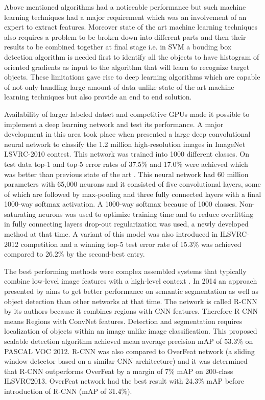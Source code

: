 \documentclass[11pt]{article}
\begin{document}
Above mentioned algorithms had a noticeable performance but such machine learning techniques had a major requirement which was an involvement of an expert to extract features. Moreover state of the art machine learning techniques also requires a problem to be broken down into different parts and then their results to be combined together at final stage i.e. in SVM a bouding box detection algorithm is needed first to identify all the objects to have histogram of oriented gradients as input to the algorithm that will learn to recognize target objects. These limitations gave rise to deep learning algorithms which are capable of not only handling large amount of data unlike state of the art machine learning techniques but also provide an end to end solution.

Availability of larger labeled datset and competitive GPUs made it possible to implement a deep learning network and test its performance. A major development in this area took place when \cite{krizhevsky2012imagenet} presented a large deep convolutional neural network to classify the 1.2 million high-resolution images in ImageNet LSVRC-2010 contest. This network was trained into 1000 different classes. On test data top-1 and top-5 error rates of 37.5\% and 17.0\% were achieved which was better than previous state of the art \cite{krizhevsky2012imagenet}. This neural network had 60 million parameters with 65,000 neurons and it consisted of five convolutional layers, some of which are followed by max-pooling and three fully connected layers with a final 1000-way softmax activation. A 1000-way softmax because of 1000 classes. Non-saturating neurons was used to optimize training time and to reduce overfitting in fully connecting layers drop-out regularization was used, a newly developed method at that time. A variant of this model was also introduced in ILSVRC-2012 competition and a winning top-5 test error rate of 15.3\% was achieved
compared to 26.2\% by the second-best entry.

The best performing methods were complex assembled systems that typically combine low-level image features with a high-level context \cite{girshick_rich_2013}. In 2014 an approach presented by \cite{girshick_rich_2013} aims to get better performance on semantic segmentation as well as object detection than other networks at that time. The network is called R-CNN by its authors because it combines regions with CNN features. Therefore R-CNN means Regions with ConvNet features. Detection and segmentation requires localization of objects within an image unlike image classification. This proposed scalable detection algorithm achieved mean average precision mAP of 53.3\% on PASCAL VOC 2012. R-CNN was also compared to OverFeat network (a sliding window detector based on a similar CNN architecture) and it was determined that R-CNN outperforms OverFeat by a margin of 7\% mAP on 200-class ILSVRC2013. OverFeat network had the best result with 24.3\% mAP before introduction of R-CNN (mAP of 31.4\%).
\end{document}
